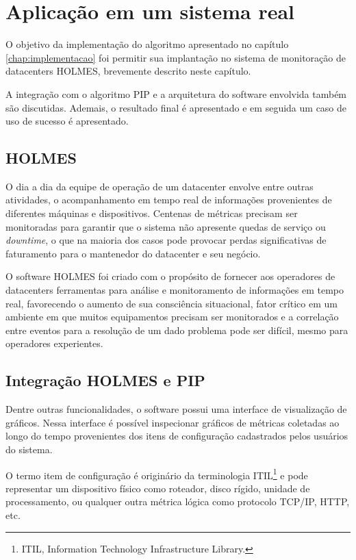 \chapter{Aplicação em um sistema real}
\label{chap:holmes}

O objetivo da implementação do algoritmo apresentado no capítulo \ref{chap:implementacao} foi permitir sua implantação no sistema de monitoração de datacenters HOLMES, brevemente descrito neste capítulo. 

A integração com o algoritmo PIP e a arquitetura do software envolvida também são discutidas. Ademais, o resultado final é apresentado e em seguida um caso de uso de sucesso é apresentado.

\section{HOLMES}

O dia a dia da equipe de operação de um datacenter envolve entre outras atividades, o acompanhamento em tempo real de informações provenientes de diferentes máquinas e dispositivos. Centenas de métricas precisam ser monitoradas para garantir que o sistema não apresente quedas de serviço ou \textit{downtime}, o que na maioria dos casos pode provocar perdas significativas de faturamento para o mantenedor do datacenter e seu negócio.

O software HOLMES foi criado com o propósito de fornecer aos operadores de datacenters ferramentas para análise e monitoramento de informações em tempo real, favorecendo o aumento de sua consciência situacional, fator crítico em um ambiente em que muitos equipamentos precisam ser monitorados e a correlação entre eventos para a resolução de um dado problema pode ser difícil, mesmo para operadores experientes.

\section{Integração HOLMES e PIP}
Dentre outras funcionalidades, o software possui uma interface de visualização de gráficos. Nessa interface é possível inspecionar gráficos de métricas coletadas ao longo do tempo provenientes dos itens de configuração cadastrados pelos usuários do sistema.

O termo item de configuração é originário da terminologia ITIL\footnote{ITIL, Information Technology Infrastructure Library.} e pode representar um dispositivo físico como roteador, disco rígido, unidade de processamento, ou qualquer outra métrica lógica como protocolo TCP/IP, HTTP, etc.

